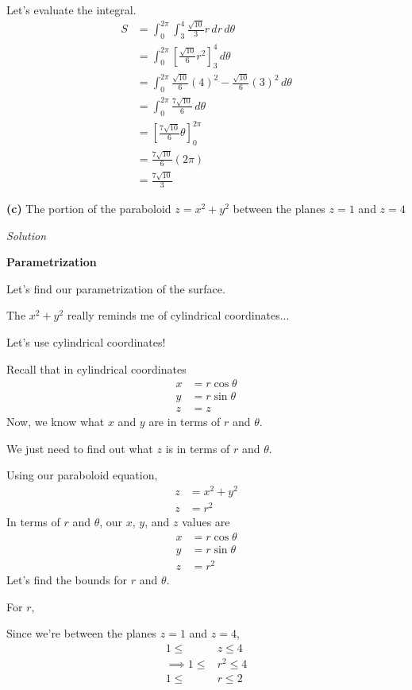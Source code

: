 \documentclass{article}
\newcommand{\lrp}[1]{\left( #1 \right)}
\newcommand{\lrb}[1]{\left[ #1 \right]}
\newcommand{\Solution}{\textit{Solution}}
\begin{document}
Let's evaluate the integral.
\begin{align*}
    S&=\int_0^{2\pi}\int_3^4\frac{\sqrt{10}}{3}r\,dr\,d\theta\\
    &=\int_0^{2\pi}\lrb{\frac{\sqrt{10}}{6}r^2}_3^4\,d\theta\\
    &=\int_0^{2\pi}\frac{\sqrt{10}}{6}(4)^2-\frac{\sqrt{10}}{6}(3)^2\,d\theta\\
    &=\int_0^{2\pi}\frac{7\sqrt{10}}{6}\,d\theta\tag{use a calculator}\\
    &=\lrb{\frac{7\sqrt{10}}{6}\theta}_0^{2\pi}\\
    &=\frac{7\sqrt{10}}{6}\lrp{2\pi}\\
    &=\boxed{\frac{7\sqrt{10}}{3}}
\end{align*}
{}\textbf{(c)} The portion of the paraboloid $z=x^2+y^2$ between the planes $z=1$ and $z=4$

\Solution

{}\textbf{Parametrization}

Let's find our parametrization of the surface.

The $x^2+y^2$ really reminds me of cylindrical coordinates...

Let's use cylindrical coordinates!

Recall that in cylindrical coordinates
\begin{align*}
    x&=r\cos\theta\\
    y&=r\sin\theta\\
    z&=z
\end{align*}
Now, we know what $x$ and $y$ are in terms of $r$ and $\theta$.

We just need to find out what $z$ is in terms of $r$ and $\theta$.

Using our paraboloid equation,
\begin{align*}
    z&=x^2+y^2\\
    z&=r^2\tag{in polar, $x^2+y^2=1$}
\end{align*}
In terms of $r$ and $\theta$, our $x$, $y$, and $z$ values are
\begin{align*}
    x&=r\cos\theta\\
    y&=r\sin\theta\\
    z&=r^2
\end{align*}
Let's find the bounds for $r$ and $\theta$.

For $r$,

Since we're between the planes $z=1$ and $z=4$,
\begin{align*}
    1\leq&z\leq 4\\
    \implies 1\leq &r^2\leq 4\\
    1\leq &r\leq 2\tag{$r\geq 0$ is always true}
\end{align*}
\end{document}
